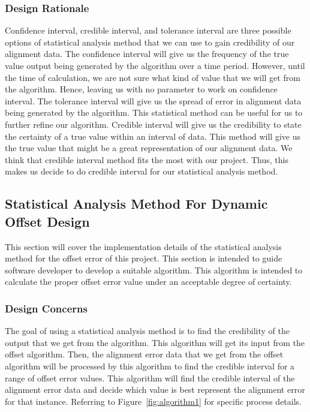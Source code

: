 		\subsubsection{Design Rationale}
		Confidence interval, credible interval, and tolerance interval are three possible options of statistical analysis method that we can use to gain credibility of our alignment data. The confidence interval will give us the frequency of the true value output being generated by the algorithm over a time period. However, until the time of calculation, we are not sure what kind of value that we will get from the algorithm. Hence, leaving us with no parameter to work on confidence interval. The tolerance interval will give us the spread of error in alignment data being generated by the algorithm. This statistical method can be useful for us to further refine our algorithm. Credible interval will give us the credibility to state the certainty of a true value within an interval of data. This method will give us the true value that might be a great representation of our alignment data. We think that credible interval method fits the most with our project. Thus, this makes us decide to do credible interval for our statistical analysis method.

	\subsection{Statistical Analysis Method For Dynamic Offset Design}
	This section will cover the implementation details of the statistical analysis method for the offset error of this project. This section is intended to guide software developer to develop a suitable algorithm. This algorithm is intended to calculate the proper offset error value under an acceptable degree of certainty.\\ 

		\subsubsection{Design Concerns}
		The goal of using a statistical analysis method is to find the credibility of the output that we get from the algorithm. This algorithm will get its input from the offset algorithm. Then, the alignment error data that we get from the offset algorithm will be processed by this algorithm to find the credible interval for a range of offset error values. This algorithm will find the credible interval of the alignment error data and decide which value is best represent the alignment error for that instance. Referring to Figure~\ref{fig:algorithm1} for specific process details.\\


